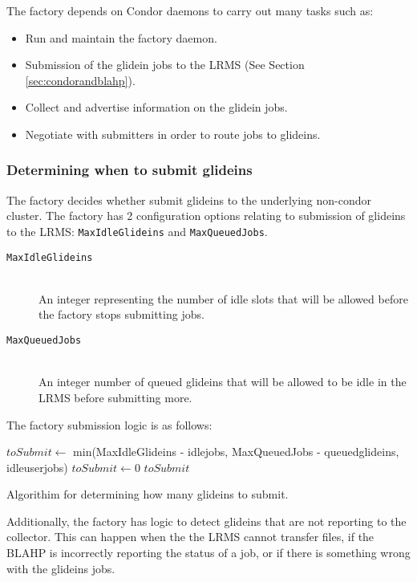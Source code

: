 \documentclass[11pt]{article}
\begin{document}
The factory depends on Condor daemons to carry out many tasks such as:
\begin{itemize}
\item Run and maintain the factory daemon.
\item Submission of the glidein jobs to the LRMS (See Section \ref{sec:condorandblahp}).
\item Collect and advertise information on the glidein jobs.
\item Negotiate with submitters in order to route jobs to glideins.
\end{itemize}


\subsubsection{Determining when to submit glideins}
The factory decides whether submit glideins to the underlying non-condor cluster.  The factory has 2 configuration options relating to submission of glideins to the LRMS: \texttt{MaxIdleGlideins} and \texttt{MaxQueuedJobs}.

\begin{description}
\item[ \texttt{MaxIdleGlideins}] \hfill \\
An integer representing the number of idle slots that will be allowed before the factory stops submitting jobs. 

\item[ \texttt{MaxQueuedJobs}] \hfill \\
An integer number of queued glideins that will be allowed to be idle in the LRMS before submitting more. 

\end{description}

The factory submission logic is as follows:

\begin{algorithm}
\begin{algorithmic}
	\STATE $toSubmit \gets$ min(MaxIdleGlideins - idlejobs, MaxQueuedJobs - queuedglideins, idleuserjobs)
\ELSE
	\STATE $toSubmit \gets 0$
\ENDIF
\RETURN $toSubmit$

\end{algorithmic}
\caption{Algorithim for determining how many glideins to submit.}
\end{algorithm}

Additionally, the factory has logic to detect glideins that are not reporting to the collector.  This can happen when the the LRMS cannot transfer files, if the BLAHP is incorrectly reporting the status of a job, or if there is something wrong with the glideins jobs.
\end{document}
